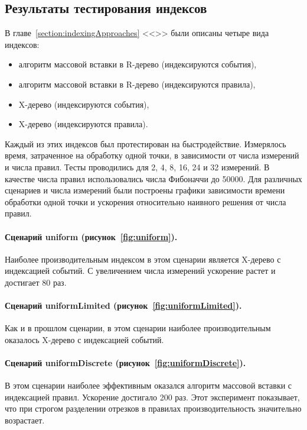 \documentclass[14pt]{article}
\begin{document}
\subsection{Результаты тестирования индексов}
\label{section:indexTestingResults}
В главе~\ref{section:indexingApproaches} <<>> были описаны четыре вида индексов:
\begin{itemize}
    \item алгоритм массовой вставки в R-дерево (индексируются события),
    \item алгоритм массовой вставки в R-дерево (индексируются правила),
    \item X-дерево (индексируются события),
    \item X-дерево (индексируются правила).
\end{itemize}
Каждый из этих индексов был протестирован на быстродействие. Измерялось время, затраченное на обработку одной точки, в зависимости от числа измерений и числа правил. Тесты проводились для 2, 4, 8, 16, 24 и 32 измерений. В качестве числа правил использовались числа Фибоначчи до 50000. Для различных сценариев и числа измерений были построены графики зависимости времени обработки одной точки и ускорения относительно наивного решения от числа правил.

\paragraph{Сценарий uniform (рисунок~\ref{fig:uniform}).} Наиболее производительным индексом в этом сценарии является X-дерево с индексацией событий. С увеличением числа измерений ускорение растет и достигает 80 раз.

\paragraph{Сценарий uniformLimited (рисунок~\ref{fig:uniformLimited}).} Как и в прошлом сценарии, в этом сценарии наиболее производительным оказалось X-дерево с индексацией событий.

\paragraph{Сценарий uniformDiscrete (рисунок~\ref{fig:uniformDiscrete}).} В этом сценарии наиболее эффективным оказался алгоритм массовой вставки с индексацией правил. Ускорение достигало 200 раз. Этот эксперимент показывает, что при строгом разделении отрезков в правилах производительность значительно возрастает.
\end{document}

